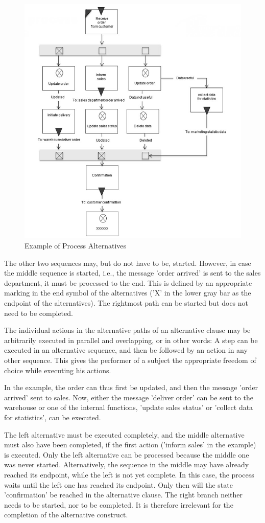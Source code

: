 \begin{figure}[htbp]
	\centering
	\includegraphics[width=0.7\linewidth]{Figures/Ontology/SubjectExecution/ALternative}
	\caption[Example of Process Alternatives]{Example of Process Alternatives}
	\label{fig:alternative}
\end{figure}

The other two sequences may, but do not have to be, started. However, in case the middle sequence is started, i.e., the message 'order arrived' is sent to the sales department, it must be processed to the end. This is defined by an appropriate marking in the end symbol of the alternatives ('X' in the lower gray bar as the endpoint of the alternatives). The rightmost path can be started but does not need to be completed.

The individual actions in the alternative paths of an alternative clause may be arbitrarily executed in parallel and overlapping, or in other words: A step can be executed in an alternative sequence, and then be followed by an action in any other sequence. This gives the performer of a subject the appropriate freedom of choice while executing his actions.

In the example, the order can thus first be updated, and then the message 'order arrived' sent to sales. Now, either the message 'deliver order' can be sent to the warehouse or one of the internal functions, 'update sales status' or 'collect data for statistics', can be executed.

The left alternative must be executed completely, and the middle alternative must also have been completed, if the first action ('inform sales' in the example) is executed. Only the left alternative can be processed because the middle one was never started. Alternatively, the sequence in the middle may have already reached its endpoint, while the left is not yet complete. In this case, the process waits until the left one has reached its endpoint. Only then will the state 'confirmation' be reached in the alternative clause. The right branch neither needs to be started, nor to be completed. It is therefore irrelevant for the completion of the alternative construct.

